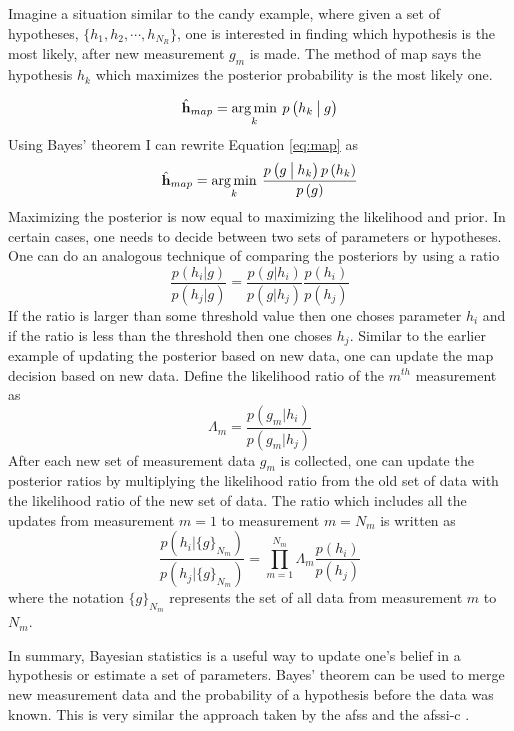Imagine a situation similar to the candy example, where given a set of hypotheses, $ \{ {h}_1, {h}_2, \cdots, h_{N_R} \}$, one is interested in finding which hypothesis is the most likely, after new measurement $g_m$ is made. The method of \acrfull{map} says the hypothesis $ {h}_k $ which maximizes the posterior probability is the most likely one. 

\begin{equation}
	\mbh{h}_{map} = \argminA_{k} \: p\left( {h}_k \given[\big] g \right) 
	\label{eq:map}
\end{equation} 
Using Bayes' theorem I can rewrite Equation \ref{eq:map} as 
\begin{equation}
	\mbh{h}_{map} = \argminA_{k} \: \frac{ p\left( g  \given[\big] {h}_k \right) p\left( {h}_k \right) } { p\left(  g \right) }
\end{equation} 
Maximizing the posterior is now equal to maximizing the likelihood and prior. In certain cases, one needs to decide between two sets of parameters or hypotheses. One can do an analogous technique of comparing the posteriors by using a ratio
%
\begin{equation}
	\frac{ p( {h}_i | g ) }{ p( {h}_j | g ) } = \frac{ p(g|{h}_i) }{ p(g|{h}_j)} \frac{p({h}_i)}{p({h}_j)}
\end{equation}
%
If the ratio is larger than some threshold value then one choses parameter $h_i$ and if the ratio is less than the threshold then one choses $h_j$. Similar to the earlier example of updating the posterior based on new data, one can update the \gls{map} decision based on new data. Define the likelihood ratio of the $m^{th}$ measurement as 
\begin{equation}
	\Lambda_m = \frac{ p(g_m|{h}_i) }{ p(g_m|{h}_j)}
\end{equation}
After each new set of measurement data $g_{m}$ is collected, one can update the posterior ratios by multiplying the likelihood ratio from the old set of data with the likelihood ratio of the new set of data. The ratio which includes all the updates from measurement $m = 1$ to measurement $m = N_m$ is written as
\begin{equation}
	\frac{ p( {h}_i| \{ g \} _{N_m} ) }{ p( {h}_j | \{ g \} _{N_m} ) } = \displaystyle\prod_{m=1}^{N_m} \Lambda_m \frac{p({h}_i)}{p({h}_j)}
\end{equation}
where the notation $\{ g \} _{N_m}$ represents the set of all data from measurement $m$ to $N_m$.

In summary, Bayesian statistics is a useful way to update one's belief in a hypothesis or estimate a set of parameters. Bayes' theorem can be used to merge new measurement data and the probability of a hypothesis before the data was known. This is very similar the approach taken by the \gls{afss} and the \gls{afssi-c} \cite{dinakarababu2011adaptive, dunlop2016experimental}. 

